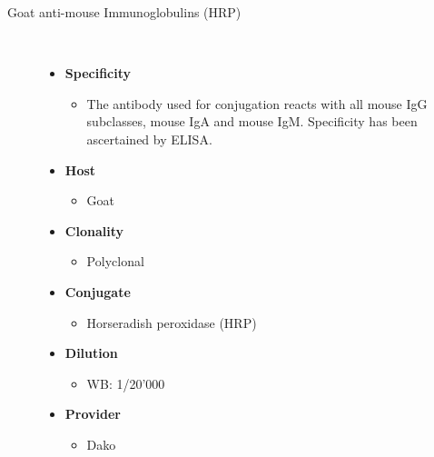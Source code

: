 \begin{description}
\item[Goat anti-mouse Immunoglobulins (HRP)]~\par
 \begin{itemize}
      \item[] \textbf{Specificity}
      \begin{itemize}
         \item[] The antibody used for conjugation reacts with all mouse IgG subclasses, mouse IgA and mouse IgM. Specificity has been ascertained by ELISA. 
      \end{itemize}
      \item[] \textbf{Host}
      \begin{itemize}
      \item[] Goat
      \end{itemize}
            \item[] \textbf{Clonality}
      \begin{itemize}
      \item[] Polyclonal
      \end{itemize}
            \item[] \textbf{Conjugate}
      \begin{itemize}
      \item[]Horseradish peroxidase (HRP) 
      \end{itemize}
                  \item[] \textbf{Dilution}
      \begin{itemize}
      \item[]WB: 1/20'000 
      \end{itemize}       
                  \item[] \textbf{Provider}
      \begin{itemize}
      \item[] Dako
      \end{itemize}     
   \end{itemize}   



\end{description}
